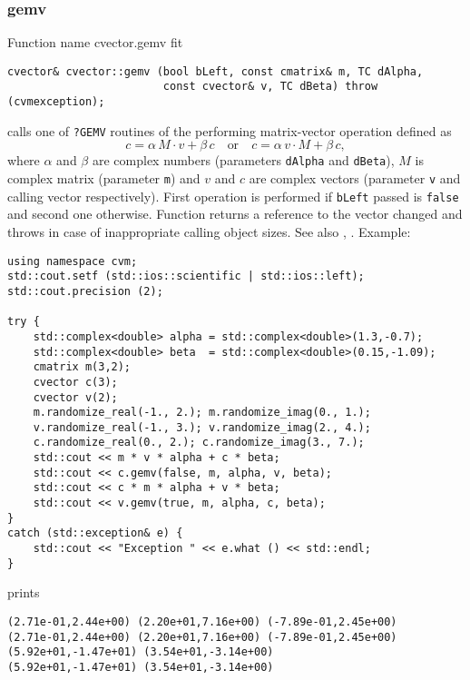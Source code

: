 \subsubsection{gemv}
Function%
\pdfdest name {cvector.gemv} fit
\begin{verbatim}
cvector& cvector::gemv (bool bLeft, const cmatrix& m, TC dAlpha,
                        const cvector& v, TC dBeta) throw (cvmexception);
\end{verbatim}
calls one of \verb"?GEMV" routines of the
performing  matrix-vector operation defined as
\begin{equation*}
c=\alpha\,M\cdot v + \beta\,c\quad\text{or}\quad c=\alpha\,v\cdot M + \beta\, c,
\end{equation*}
where $\alpha$ and $\beta$ are complex numbers
(parameters \verb"dAlpha" and \verb"dBeta"),
$M$ is  complex matrix (parameter \verb"m")
and $v$ and $c$ are complex vectors (parameter \verb"v"
and calling vector respectively).
First operation is performed if \verb"bLeft" passed
is \verb"false" and second one otherwise.
Function
returns a reference to the vector changed and throws
in case of inappropriate calling object sizes.
See also
,
.
Example:
\begin{Verbatim}
using namespace cvm;
std::cout.setf (std::ios::scientific | std::ios::left);
std::cout.precision (2);

try {
    std::complex<double> alpha = std::complex<double>(1.3,-0.7);
    std::complex<double> beta  = std::complex<double>(0.15,-1.09);
    cmatrix m(3,2);
    cvector c(3);
    cvector v(2);
    m.randomize_real(-1., 2.); m.randomize_imag(0., 1.);
    v.randomize_real(-1., 3.); v.randomize_imag(2., 4.);
    c.randomize_real(0., 2.); c.randomize_imag(3., 7.);
    std::cout << m * v * alpha + c * beta;
    std::cout << c.gemv(false, m, alpha, v, beta);
    std::cout << c * m * alpha + v * beta;
    std::cout << v.gemv(true, m, alpha, c, beta);
}
catch (std::exception& e) {
    std::cout << "Exception " << e.what () << std::endl;
}
\end{Verbatim}
prints
\begin{Verbatim}
(2.71e-01,2.44e+00) (2.20e+01,7.16e+00) (-7.89e-01,2.45e+00)
(2.71e-01,2.44e+00) (2.20e+01,7.16e+00) (-7.89e-01,2.45e+00)
(5.92e+01,-1.47e+01) (3.54e+01,-3.14e+00)
(5.92e+01,-1.47e+01) (3.54e+01,-3.14e+00)
\end{Verbatim}
\newpage



